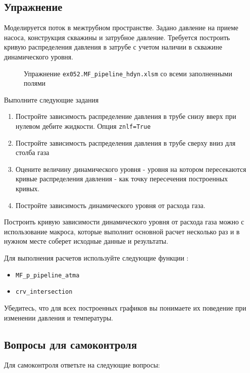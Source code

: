 \subsection{Упражнение}
Моделируется поток в межтрубном пространстве.  Задано давление на приеме насоса, конструкция скважины и затрубное давление. Требуется построить кривую распределения давления в затрубе с учетом наличии в скважине динамического уровня.

\begin{figure}[h!]
	\center{\texttt{[image: Ex52\_1]}}
	\caption{Упражнение \texttt{ex052.MF_pipeline_hdyn.xlsm} со всеми заполненными полями }
	\label{ris:Ex52_1}
\end{figure}

Выполните следующие задания
\begin{enumerate}
	\item Постройте зависимость распределение давления в трубе снизу вверх при нулевом дебите жидкости. Опция \texttt{znlf=True}
	
	\item Постройте зависимость распределения давления в трубе сверху вниз для столба газа
	
	\item Оцените величину динамического уровня - уровня на котором пересекаются кривые распределения давления - как точку пересечения построенных кривых. 
	
	\item Постройте зависимость динамического уровня от расхода газа. 
	
\end{enumerate}

Построить кривую зависимости динамического уровня от расхода газа можно с использование макроса, которые выполнит основной расчет несколько раз и в нужном месте соберет исходные данные и результаты.

Для выполнения расчетов используйте следующие функции \unf{}:
\begin{itemize}
	
	\item \texttt{MF_p_pipeline_atma}
	\item \texttt{crv_intersection}
\end{itemize}

Убедитесь, что для всех построенных графиков вы понимаете их поведение при изменении давления и температуры. 

\subsection{Вопросы для самоконтроля}
Для самоконтроля ответьте на следующие вопросы:

